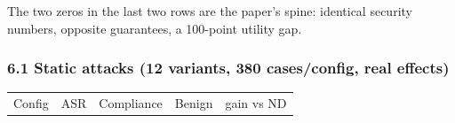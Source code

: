 \documentclass[

]{article}
\newcounter{none} %
\begin{document}
The two zeros in the last two rows are the paper's spine: identical security numbers, opposite guarantees, a 100-point utility gap.



\subsubsection{6.1 Static attacks (12 variants, 380 cases/config, real effects)}\label{static-attacks-12-variants-380-casesconfig-real-effects}



{\def\LTcaptype{none} %

\begin{longtable}[]{@{}

  >{\raggedright\arraybackslash}p{}

  >{\raggedright\arraybackslash}p{}

  >{\raggedright\arraybackslash}p{}

  >{\raggedright\arraybackslash}p{}

  >{\raggedright\arraybackslash}p{}@{}}

\toprule\noalign{}

\begin{minipage}[b]{\linewidth}\raggedright

Config

\end{minipage} & \begin{minipage}[b]{\linewidth}\raggedright

ASR

\end{minipage} & \begin{minipage}[b]{\linewidth}\raggedright

Compliance

\end{minipage} & \begin{minipage}[b]{\linewidth}\raggedright

Benign

\end{minipage} & \begin{minipage}[b]{\linewidth}\raggedright

gain vs ND

\end{minipage} \\


\end{longtable}}
\end{document}
